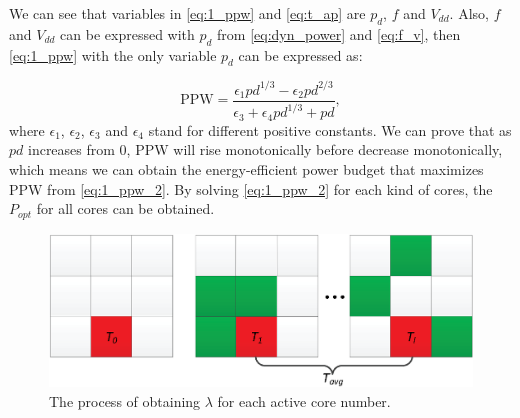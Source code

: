 

We can see that variables in \eqref{eq:1_ppw} and \eqref{eq:t_ap} are $p_{d}$, $f$ and $V_{dd}$. Also, $f$ and $V_{dd}$ can be expressed with $p_{d}$ from \eqref{eq:dyn_power} and \eqref{eq:f_v}, then \eqref{eq:1_ppw} with the only variable $p_{d}$ can be expressed as:

\begin{equation}\label{eq:1_ppw_2}
\text{PPW} = \frac{\epsilon_{1}pd^{1/3}-\epsilon_{2}pd^{2/3}}{\epsilon_{3}+\epsilon_{4}pd^{1/3}+pd},
\end{equation}
where $\epsilon_{1}$, $\epsilon_{2}$, $\epsilon_{3}$ and $\epsilon_{4}$ stand for different positive constants. We can prove that as $pd$ increases from $0$, PPW will rise monotonically before decrease monotonically, which means we can obtain the energy-efficient power budget that maximizes PPW from \eqref{eq:1_ppw_2}. By solving \eqref{eq:1_ppw_2} for each kind of cores, the $P_{opt}$ for all cores can be obtained.



\begin{figure}
\centering
\includegraphics[width=0.9\linewidth]{fig/tavg.eps}
\caption{The process of obtaining $\lambda$ for each active core number.}
\label{fig:tavg}
\end{figure}

